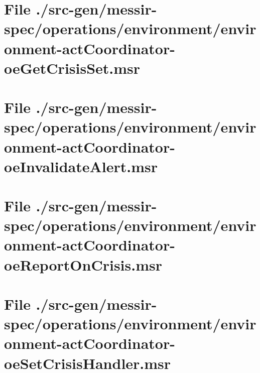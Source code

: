 \section[File /src-gen/messir-spec.../environment-actCoordinator-oeGetCrisisSet.msr]{File ./src-gen/messir-spec/operations/environment/environment-actCoordinator-oeGetCrisisSet.msr}
\scriptsize

\normalsize
	
\section[File /src-gen/messir-spec.../environment-actCoordinator-oeInvalidateAlert.msr]{File ./src-gen/messir-spec/operations/environment/environment-actCoordinator-oeInvalidateAlert.msr}
\scriptsize

\normalsize
	
\section[File /src-gen/messir-spec.../environment-actCoordinator-oeReportOnCrisis.msr]{File ./src-gen/messir-spec/operations/environment/environment-actCoordinator-oeReportOnCrisis.msr}
\scriptsize

\normalsize
	
\section[File /src-gen/messir-spec.../environment-actCoordinator-oeSetCrisisHandler.msr]{File ./src-gen/messir-spec/operations/environment/environment-actCoordinator-oeSetCrisisHandler.msr}
\scriptsize

\normalsize
	
